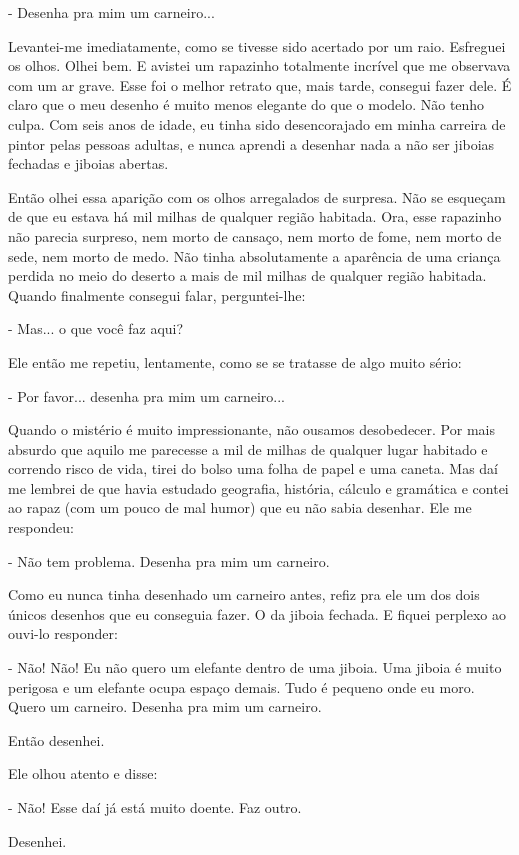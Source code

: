 - Desenha pra mim um carneiro...

Levantei-me imediatamente, como se tivesse sido acertado por um raio.
Esfreguei os olhos. Olhei bem. E avistei um rapazinho totalmente
incrível que me observava com um ar grave. Esse foi o melhor retrato
que, mais tarde, consegui fazer dele. É claro que o meu desenho é muito
menos elegante do que o modelo. Não tenho culpa. Com seis anos de idade,
eu tinha sido desencorajado em minha carreira de pintor pelas pessoas
adultas, e nunca aprendi a desenhar nada a não ser jiboias fechadas e
jiboias abertas.

Então olhei essa aparição com os olhos arregalados de surpresa. Não se
esqueçam de que eu estava há mil milhas de qualquer região habitada.
Ora, esse rapazinho não parecia surpreso, nem morto de cansaço, nem
morto de fome, nem morto de sede, nem morto de medo. Não tinha
absolutamente a aparência de uma criança perdida no meio do deserto a
mais de mil milhas de qualquer região habitada. Quando finalmente
consegui falar, perguntei-lhe:

- Mas... o que você faz aqui?

Ele então me repetiu, lentamente, como se se tratasse de algo muito
sério:

- Por favor... desenha pra mim um carneiro...

Quando o mistério é muito impressionante, não ousamos desobedecer. Por
mais absurdo que aquilo me parecesse a mil de milhas de qualquer lugar
habitado e correndo risco de vida, tirei do bolso uma folha de papel e
uma caneta. Mas daí me lembrei de que havia estudado geografia,
história, cálculo e gramática e contei ao rapaz (com um pouco de mal
humor) que eu não sabia desenhar. Ele me respondeu:

- Não tem problema. Desenha pra mim um carneiro.

Como eu nunca tinha desenhado um carneiro antes, refiz pra ele um dos
dois únicos desenhos que eu conseguia fazer. O da jiboia fechada. E
fiquei perplexo ao ouvi-lo responder:

- Não! Não! Eu não quero um elefante dentro de uma jiboia. Uma jiboia é
muito perigosa e um elefante ocupa espaço demais. Tudo é pequeno onde eu
moro. Quero um carneiro. Desenha pra mim um carneiro.

Então desenhei.

Ele olhou atento e disse:

- Não! Esse daí já está muito doente. Faz outro.

Desenhei.

